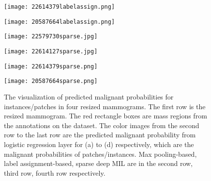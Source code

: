 \documentclass[runningheads,a4paper]{llncs}
\begin{document}
\begin{figure}[!t]
\begin{center}
		\hspace{1cm}
		\begin{minipage}{0.15\linewidth}
			\centerline{\texttt{[image: 22614379labelassign.png]}}
		\end{minipage}
		\hspace{1cm}
		\begin{minipage}{0.15\linewidth}
			\centerline{\texttt{[image: 20587664labelassign.png]}}
		\end{minipage}
		\vfill
		\begin{minipage}{0.15\linewidth}
			\centerline{\texttt{[image: 22579730sparse.jpg]}}
		\end{minipage}
		\hspace{1cm}
		\begin{minipage}{0.15\linewidth}
			\centerline{\texttt{[image: 22614127sparse.jpg]}}
		\end{minipage}
		\hspace{1cm}
		\begin{minipage}{0.15\linewidth}
			\centerline{\texttt{[image: 22614379sparse.png]}}
		\end{minipage}
		\hspace{1cm}
		\begin{minipage}{0.15\linewidth}
			\centerline{\texttt{[image: 20587664sparse.png]}}
		\end{minipage}
		\caption{The visualization of predicted malignant probabilities for instances/patches in four resized mammograms. The first row is the resized mammogram. The red rectangle boxes are mass regions from the annotations on the dataset. The color images from the second row to the last row are the predicted malignant probability from logistic regression layer for (a) to (d) respectively, which are the malignant probabilities of patches/instances. Max pooling-based, label assignment-based, sparse deep MIL are in the second row, third row, fourth row respectively.}
		\label{fig:visresponse}
	\end{center}
\end{figure}
\end{document}
